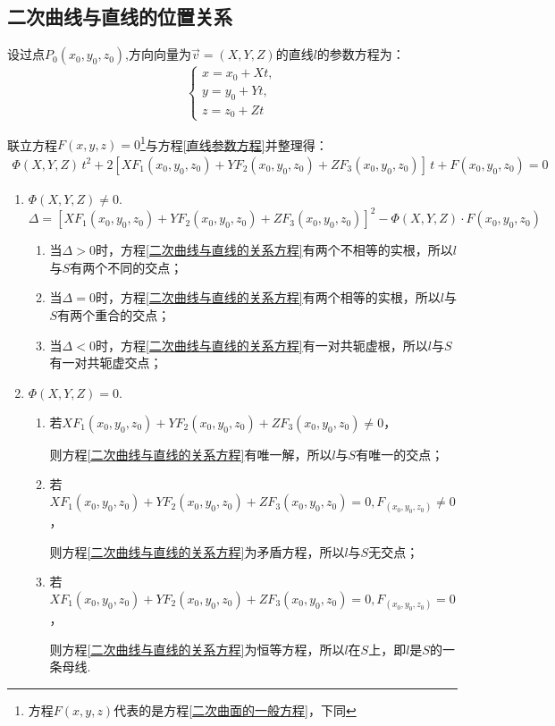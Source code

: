 \subsection{二次曲线与直线的位置关系}
设过点$P_0(x_0,y_0,z_0)$,方向向量为$\overrightarrow{v}=(X,Y,Z)$的直线$l$的参数方程为：
\begin{equation}
\label{直线参数方程}
\begin{cases}
x=x_0+Xt,\\
y=y_0+Yt,\\
z=z_0+Zt
\end{cases}
\end{equation}
\par 联立方程$F(x,y,z)=0$\footnote[1]{方程$F(x,y,z)$代表的是方程\eqref{二次曲面的一般方程}，下同}与方程\eqref{直线参数方程}并整理得：
\begin{equation}
\label{二次曲线与直线的关系方程}
\begin{split}
\varPhi(X,Y,Z) \, t^2+2\left[  XF_1(x_0,y_0,z_0)  +YF_2(x_0,y_0,z_0)+ZF_3(x_0,y_0,z_0) \right]  \,t+F(x_0,y_0,z_0)=0
\end{split}
\end{equation}
\begin{enumerate}
	\setlength{\topsep}{0.01em}
	\setlength{\itemsep}{0.01em}
	\item $\varPhi(X,Y,Z) \ne 0.$
	\begin{equation}
	\Delta = \left[  XF_1(x_0,y_0,z_0)  +YF_2(x_0,y_0,z_0)+ZF_3(x_0,y_0,z_0) \right]^2-\varPhi(X,Y,Z) \cdot F(x_0,y_0,z_0)
	\end{equation}
	\begin{enumerate}
		\setlength{\topsep}{0.01em}
		\setlength{\itemsep}{0.01em}
		\item 当$\Delta>0$时，方程\eqref{二次曲线与直线的关系方程}有两个不相等的实根，所以$l$与$S$有两个不同的交点；
		\item 当$\Delta=0$时，方程\eqref{二次曲线与直线的关系方程}有两个相等的实根，所以$l$与$S$有两个重合的交点；
		\item 当$\Delta<0$时，方程\eqref{二次曲线与直线的关系方程}有一对共轭虚根，所以$l$与$S$有一对共轭虚交点；
	\end{enumerate}
	\item $\varPhi(X,Y,Z) = 0.$
	\begin{enumerate}
		\item 若$XF_1(x_0,y_0,z_0)  +YF_2(x_0,y_0,z_0)+ZF_3(x_0,y_0,z_0) \ne 0$，
		\par \kg 则方程\eqref{二次曲线与直线的关系方程}有唯一解，所以$l$与$S$有唯一的交点；
		\item 若$XF_1(x_0,y_0,z_0)  +YF_2(x_0,y_0,z_0)+ZF_3(x_0,y_0,z_0) = 0 , F_(x_0,y_0,z_0) \ne 0 $，
		\par \kg 则方程\eqref{二次曲线与直线的关系方程}为矛盾方程，所以$l$与$S$无交点；
		\item 若$XF_1(x_0,y_0,z_0)  +YF_2(x_0,y_0,z_0)+ZF_3(x_0,y_0,z_0) = 0 , F_(x_0,y_0,z_0) = 0 $，
		\par \kg 则方程\eqref{二次曲线与直线的关系方程}为恒等方程，所以$l$在$S$上，即$l$是$S$的一条母线.
	\end{enumerate}
\end{enumerate}

